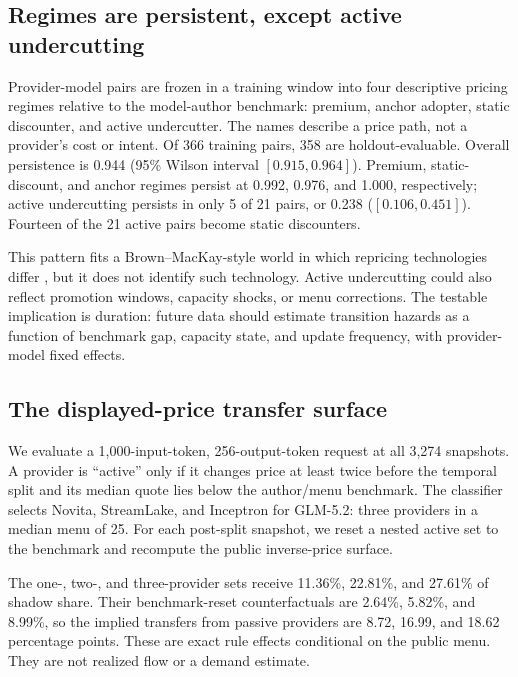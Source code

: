 \documentclass[sigconf,nonacm]{acmart}
\newcommand{\1}{\mathbf 1}
\begin{document}
\subsection{Regimes are persistent, except active undercutting}

Provider-model pairs are frozen in a training window into four descriptive
pricing regimes relative to the model-author benchmark: premium, anchor adopter,
static discounter, and active undercutter.  The names describe a price path, not
a provider's cost or intent.  Of 366 training pairs, 358 are holdout-evaluable.
Overall persistence is 0.944 (95\% Wilson interval $[0.915,0.964]$).  Premium,
static-discount, and anchor regimes persist at 0.992, 0.976, and 1.000,
respectively; active undercutting persists in only 5 of 21 pairs, or 0.238
($[0.106,0.451]$).  Fourteen of the 21 active pairs become static discounters.

This pattern fits a Brown--MacKay-style world in which repricing technologies
differ \cite{brownmackay2023}, but it does not identify such technology.  Active
undercutting could also reflect promotion windows, capacity shocks, or menu
corrections.  The testable implication is duration: future data should estimate
transition hazards as a function of benchmark gap, capacity state, and update
frequency, with provider-model fixed effects.

\subsection{The displayed-price transfer surface}
\label{sec:pricesurface}

We evaluate a 1,000-input-token, 256-output-token request at all 3,274 snapshots.
A provider is ``active'' only if it changes price at least twice before the
temporal split and its median quote lies below the author/menu benchmark.  The
classifier selects Novita, StreamLake, and Inceptron for GLM-5.2: three providers
in a median menu of 25.  For each post-split snapshot, we reset a nested active
set to the benchmark and recompute the public inverse-price surface.

The one-, two-, and three-provider sets receive 11.36\%, 22.81\%, and 27.61\%
of shadow share.  Their benchmark-reset counterfactuals are 2.64\%, 5.82\%, and
8.99\%, so the implied transfers from passive providers are 8.72, 16.99, and
18.62 percentage points.  These are exact rule effects conditional on the
public menu.  They are not realized flow or a demand estimate.
\end{document}
